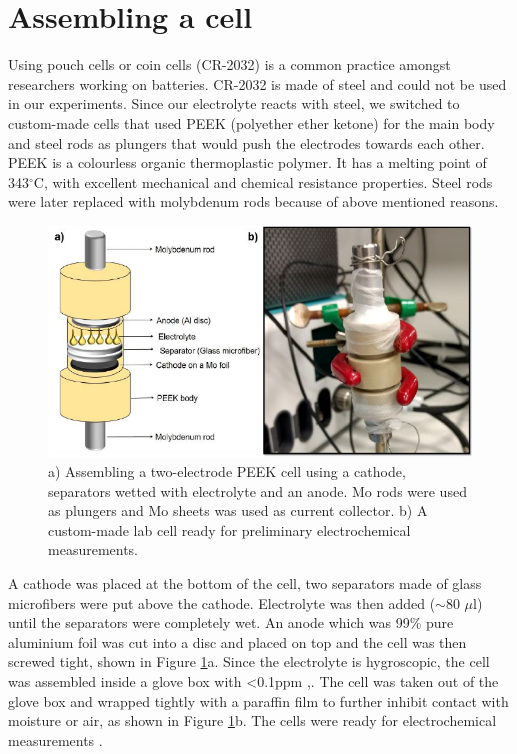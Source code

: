 \section{Assembling a cell}
Using pouch cells or coin cells (CR-2032\textregistered) is a common practice amongst researchers working on batteries. CR-2032 is made of steel and could not be used in our experiments. Since our electrolyte reacts with steel, we switched to custom-made cells that used PEEK (polyether ether ketone) for the main body and steel rods as plungers that would push the electrodes towards each other. PEEK  is a colourless organic thermoplastic polymer. It has a melting point of 343$^{\circ}$C, with excellent mechanical and chemical resistance properties. Steel rods were later replaced with molybdenum rods because of above mentioned reasons. 
\begin{figure}[tbh!]
\centering
\includegraphics[width=\textwidth]{Figures/chap3fig/swagelok}
\caption{a) Assembling a two-electrode PEEK cell using a cathode, separators wetted with electrolyte and an anode. Mo rods were used as plungers and Mo sheets was used as current collector. b) A custom-made lab cell ready for preliminary electrochemical measurements.}
\label{Figures/chap3fig:swagelok}
\end{figure}
A cathode was placed at the bottom of the cell, two separators made of glass microfibers were put above the cathode. Electrolyte was then added ($\sim$80 $\mu$l) until the separators were completely wet. An anode which was 99\% pure aluminium foil was cut into a disc and placed on top and the cell was then screwed tight, shown in Figure \ref{Figures/chap3fig:swagelok}a. Since the electrolyte is hygroscopic, the cell was assembled inside a glove box with <0.1ppm ,. The cell was taken out of the glove box and wrapped tightly with a paraffin film to further inhibit contact with moisture or air, as shown in Figure \ref{Figures/chap3fig:swagelok}b. The cells were ready for electrochemical measurements . 





















